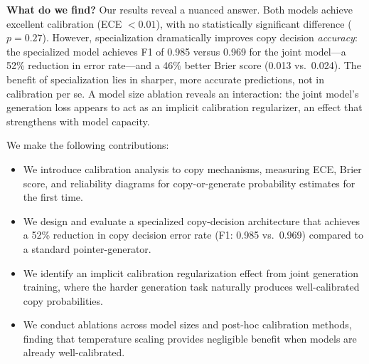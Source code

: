 {\bf What do we find?} Our results reveal a nuanced answer. Both models achieve excellent calibration (ECE $< 0.01$), with no statistically significant difference ($p = 0.27$). However, specialization dramatically improves copy decision \emph{accuracy}: the specialized model achieves F1 of 0.985 versus 0.969 for the joint model---a 52\% reduction in error rate---and a 46\% better Brier score (0.013 vs.\ 0.024). The benefit of specialization lies in sharper, more accurate predictions, not in calibration per se. A model size ablation reveals an interaction: the joint model's generation loss appears to act as an implicit calibration regularizer, an effect that strengthens with model capacity.

We make the following contributions:
\begin{itemize}[leftmargin=*,itemsep=0pt,topsep=0pt]
    \item We introduce calibration analysis to copy mechanisms, measuring ECE, Brier score, and reliability diagrams for copy-or-generate probability estimates for the first time.
    \item We design and evaluate a specialized copy-decision architecture that achieves a 52\% reduction in copy decision error rate (F1: 0.985 vs.\ 0.969) compared to a standard pointer-generator.
    \item We identify an implicit calibration regularization effect from joint generation training, where the harder generation task naturally produces well-calibrated copy probabilities.
    \item We conduct ablations across model sizes and post-hoc calibration methods, finding that temperature scaling provides negligible benefit when models are already well-calibrated.
\end{itemize}